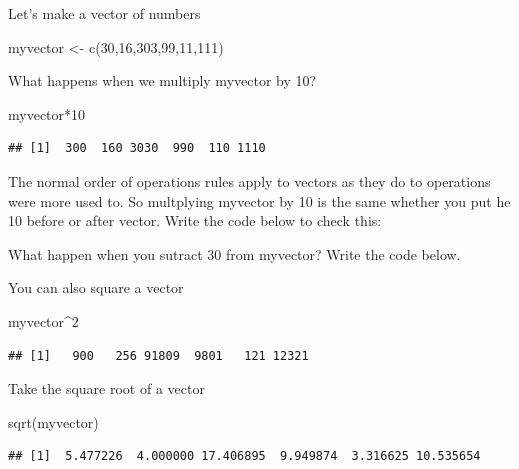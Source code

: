 \documentclass[
]{book}
\newenvironment{Shaded}{\begin{snugshade}}{\end{snugshade}}
\newcommand{\DecValTok}[1]{\textcolor[rgb]{0.00,0.00,0.81}{#1}}
\newcommand{\FunctionTok}[1]{\textcolor[rgb]{0.00,0.00,0.00}{#1}}
\newcommand{\NormalTok}[1]{#1}
\newcommand{\OtherTok}[1]{\textcolor[rgb]{0.56,0.35,0.01}{#1}}
\newcommand{\SpecialCharTok}[1]{\textcolor[rgb]{0.00,0.00,0.00}{#1}}
\begin{document}
Let's make a vector of numbers

\begin{Shaded}
\begin{Highlighting}[]
\NormalTok{myvector }\OtherTok{\textless{}{-}} \FunctionTok{c}\NormalTok{(}\DecValTok{30}\NormalTok{,}\DecValTok{16}\NormalTok{,}\DecValTok{303}\NormalTok{,}\DecValTok{99}\NormalTok{,}\DecValTok{11}\NormalTok{,}\DecValTok{111}\NormalTok{)}
\end{Highlighting}
\end{Shaded}

What happens when we multiply myvector by 10?

\begin{Shaded}
\begin{Highlighting}[]
\NormalTok{myvector}\SpecialCharTok{*}\DecValTok{10}
\end{Highlighting}
\end{Shaded}

\begin{verbatim}
## [1]  300  160 3030  990  110 1110
\end{verbatim}

The normal order of operations rules apply to vectors as they do to operations were more used to. So multplying myvector by 10 is the same whether you put he 10 before or after vector. Write the code below to check this:

What happen when you sutract 30 from myvector? Write the code below.

You can also square a vector

\begin{Shaded}
\begin{Highlighting}[]
\NormalTok{myvector}\SpecialCharTok{\^{}}\DecValTok{2}
\end{Highlighting}
\end{Shaded}

\begin{verbatim}
## [1]   900   256 91809  9801   121 12321
\end{verbatim}

Take the square root of a vector

\begin{Shaded}
\begin{Highlighting}[]
\FunctionTok{sqrt}\NormalTok{(myvector)}
\end{Highlighting}
\end{Shaded}

\begin{verbatim}
## [1]  5.477226  4.000000 17.406895  9.949874  3.316625 10.535654
\end{verbatim}
\end{document}
